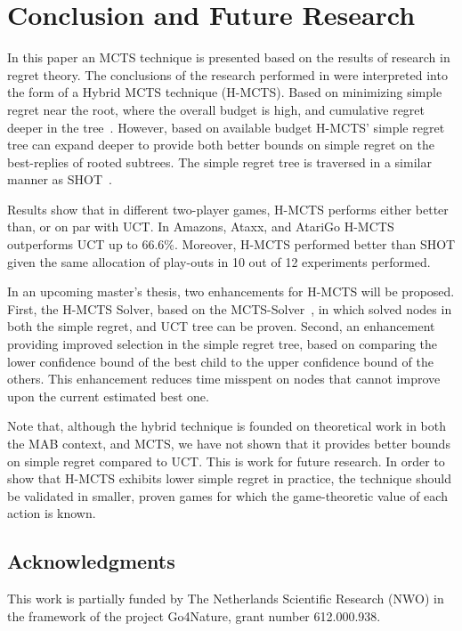 \documentclass[a4paper]{llncs}
\begin{document}
\section{Conclusion and Future Research}
\label{sec:concl}
In this paper an MCTS technique is presented based on the results of research in regret theory. The conclusions of the research performed in \cite{Bubeck11Pure} were interpreted into the form of a Hybrid MCTS technique (H-MCTS). Based on minimizing simple regret near the root, where the overall budget is high, and cumulative regret deeper in the tree~\cite{tolpin2012mcts}. However, based on available budget H-MCTS' simple regret tree can expand deeper to provide both better bounds on simple regret on the best-replies of rooted subtrees. The simple regret tree is traversed in a similar manner as SHOT~\cite{Cazenave14SHOT}.

Results show that in different two-player games, H-MCTS performs either better than, or on par with UCT. In Amazons, Ataxx, and AtariGo H-MCTS outperforms UCT up to 66.6\%. Moreover, H-MCTS performed better than SHOT given the same allocation of play-outs in 10 out of 12 experiments performed.

In an upcoming master's thesis, two enhancements for H-MCTS will be proposed. First, the H-MCTS Solver, based on the MCTS-Solver~\cite{Winands2008}, in which solved nodes in both the simple regret, and UCT tree can be proven. Second, an enhancement providing improved selection in the simple regret tree, based on comparing the lower confidence bound of the best child to the upper confidence bound of the others. This enhancement reduces time misspent on nodes that cannot improve upon the current estimated best one.

Note that, although the hybrid technique is founded on theoretical work in both the MAB context, and MCTS, we have not shown that it provides better bounds on simple regret compared to UCT. This is work for future research. In order to show that H-MCTS exhibits lower simple regret in practice, the technique should be validated in smaller, proven games for which the game-theoretic value of each action is known.

\subsection*{Acknowledgments} 
This work is partially funded by The Netherlands Scientific Research (NWO) in the framework of the project Go4Nature, grant number 612.000.938.



\end{document}
